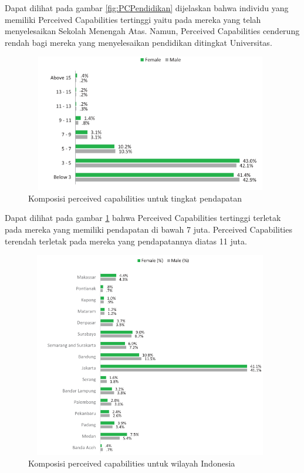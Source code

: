 Dapat dilihat pada gambar \ref{fig:PCPendidikan} dijelaskan bahwa individu yang memiliki Perceived Capabilities tertinggi yaitu pada mereka yang telah menyelesaikan Sekolah Menengah Atas. Namun, Perceived Capabilities cenderung rendah bagi mereka yang menyelesaikan pendidikan ditingkat Universitas.

\begin{figure} [H]
	\centering  
	\includegraphics[width=11cm, height=6cm]{pendapatanPC2013} 
	\caption[Komposisi perceived capabilities untuk tingkat pendapatan]{Komposisi perceived capabilities untuk tingkat pendapatan} 
	\label{fig:PCPendapatan} 
\end{figure}


Dapat dilihat pada gambar \ref{fig:PCPendapatan} bahwa Perceived Capabilities tertinggi terletak pada mereka yang memiliki pendapatan di bawah 7 juta. Perceived Capabilities terendah terletak pada mereka yang pendapatannya diatas 11 juta.


\begin{figure} [H]
	\centering  
	\includegraphics[width=11cm, height=9cm]{lokasiPC2013} 
	\caption[Komposisi perceived capabilities untuk wilayah Indonesia]{Komposisi perceived capabilities untuk wilayah Indonesia} 
	\label{fig:PCRegion} 
\end{figure}


